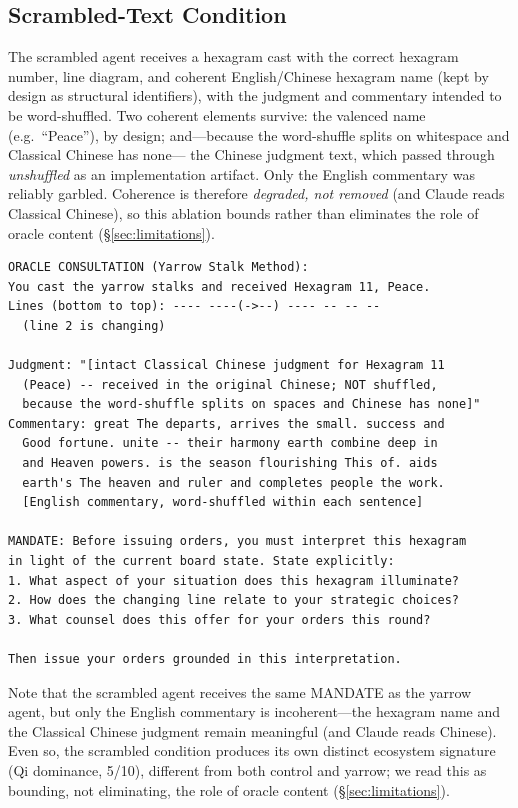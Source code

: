 \documentclass[11pt]{article}
\begin{document}
\subsection{Scrambled-Text Condition}
\label{app:scrambled}

The scrambled agent receives a hexagram cast with the correct
hexagram number, line diagram, and coherent English/Chinese hexagram
name (kept by design as structural identifiers), with the judgment
and commentary intended to be word-shuffled.  Two coherent elements
survive: the valenced name (e.g.\ ``Peace''), by design; and---because
the word-shuffle splits on whitespace and Classical Chinese has none---
the Chinese judgment text, which passed through \emph{unshuffled} as an
implementation artifact.  Only the English commentary was reliably
garbled.  Coherence is therefore \emph{degraded, not removed} (and
Claude reads Classical Chinese), so this ablation bounds rather than
eliminates the role of oracle content (\S\ref{sec:limitations}).

\begin{lstlisting}[caption={Scrambled-text condition injection (game \texttt{scrambled\_text\_7c92}, Hexagram 11), faithful to the actual prompt.  Only the English \emph{commentary} is word-shuffled; the hexagram number, the English name (``Peace''), and the Classical Chinese judgment are intact.  The Chinese judgment is shown as a placeholder because the paper uses Latin fonts---the model received the original Chinese source text.},label={lst:scrambled}]
ORACLE CONSULTATION (Yarrow Stalk Method):
You cast the yarrow stalks and received Hexagram 11, Peace.
Lines (bottom to top): ---- ----(->--) ---- -- -- --
  (line 2 is changing)

Judgment: "[intact Classical Chinese judgment for Hexagram 11
  (Peace) -- received in the original Chinese; NOT shuffled,
  because the word-shuffle splits on spaces and Chinese has none]"
Commentary: great The departs, arrives the small. success and
  Good fortune. unite -- their harmony earth combine deep in
  and Heaven powers. is the season flourishing This of. aids
  earth's The heaven and ruler and completes people the work.
  [English commentary, word-shuffled within each sentence]

MANDATE: Before issuing orders, you must interpret this hexagram
in light of the current board state. State explicitly:
1. What aspect of your situation does this hexagram illuminate?
2. How does the changing line relate to your strategic choices?
3. What counsel does this offer for your orders this round?

Then issue your orders grounded in this interpretation.
\end{lstlisting}

Note that the scrambled agent receives the same \textsc{MANDATE} as
the yarrow agent, but only the English commentary is incoherent---the
hexagram name and the Classical Chinese judgment remain meaningful
(and Claude reads Chinese).  Even so, the scrambled condition produces
its own distinct ecosystem signature (Qi dominance, 5/10), different
from both control and yarrow; we read this as bounding, not
eliminating, the role of oracle content (\S\ref{sec:limitations}).
\end{document}
